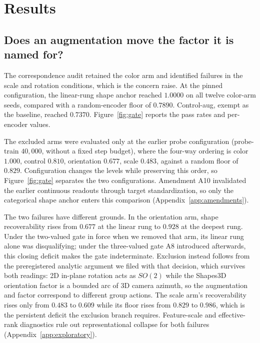 \documentclass[10pt]{article}
\begin{document}
\section{Results}
\label{sec:results}

\subsection{Does an augmentation move the factor it is named for?}
\label{sec:gate}
The correspondence audit retained the color arm and identified failures in the scale and rotation
conditions, which is the concern \citet{vonkugelgen2021self} raise. At the pinned configuration, the
linear-rung shape anchor reached $1.0000$ on all twelve color-arm seeds, compared with a
random-encoder floor of $0.7890$. Control-aug, exempt as the baseline, reached $0.7370$.
Figure~\ref{fig:gate} reports the pass rates and per-encoder values.

The excluded arms were evaluated only at the earlier probe configuration (probe-train $40{,}000$,
without a fixed step budget), where the four-way ordering is color $1.000$, control $0.810$,
orientation $0.677$, scale $0.483$, against a random floor of $0.829$. Configuration changes the
levels while preserving this order, so Figure~\ref{fig:gate} separates the two configurations.
Amendment A10 invalidated the earlier continuous readouts through target standardization, so only
the categorical shape anchor enters this comparison (Appendix~\ref{app:amendments}).


The two failures have different grounds. In the orientation arm, shape recoverability rises from
$0.677$ at the linear rung to $0.928$ at the deepest rung. Under the two-valued gate in force when
we removed that arm, its linear rung alone was disqualifying; under the three-valued gate A8
introduced afterwards, this closing deficit makes the gate indeterminate. Exclusion instead follows
from the preregistered analytic argument we filed with that decision, which survives both readings:
2D in-plane rotation acts as $SO(2)$ while the Shapes3D orientation factor is a bounded arc of 3D
camera azimuth, so the augmentation and factor correspond to different group actions. The scale
arm's recoverability rises only from $0.483$ to $0.609$ while its floor rises from $0.829$ to
$0.986$, which is the persistent deficit the exclusion branch requires. Feature-scale and effective-rank diagnostics rule out representational collapse for both failures
(Appendix~\ref{app:exploratory}).
\end{document}
